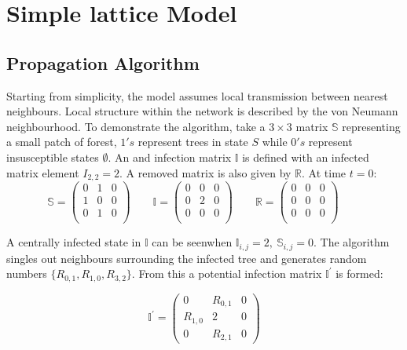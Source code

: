 \appendix
\chapter{Simple lattice Model}

\section{Propagation Algorithm}
\label{a:propagation}
Starting from simplicity, the model assumes local transmission between nearest neighbours. Local structure within the network is described by the von Neumann neighbourhood. To demonstrate the algorithm, take a $3 \times 3$  matrix $\mathbb{S}$ representing a small patch of forest, $1's$ represent trees in state $S$ while $0's$ represent insusceptible states $\emptyset$. An and infection matrix $\mathbb{I}$ is defined with an infected matrix element $I_{2,2}=2$. A removed matrix is also given by $\mathbb{R}$. At time $t=0$:
\begin{equation}
\mathbb{S}= \left( \begin{array}{ccc}
0 & 1 & 0\\
1 & 0 & 0\\
0& 1 & 0 \\
\end{array} \right)\qquad
\mathbb{I}= \left( \begin{array}{ccc}
0 & 0 & 0\\
0 &2 & 0\\
0& 0 & 0 \\
\end{array} \right)\qquad
\mathbb{R} = \left( \begin{array}{ccc}
0 & 0 & 0\\
0 & 0 & 0\\
0 & 0 & 0 \\
\end{array} \right)\qquad
\end{equation}

A centrally infected state in $\mathbb{I}$ can be seen\textemdash when $\mathbb{I}_{i,j} = 2,\ \mathbb{S}_{i,j} = 0$. The algorithm singles out neighbours surrounding the infected tree and generates random numbers $\{ R_{0,1},R_{1,0},R_{3,2}\}$. From this a potential infection matrix $\mathbb{I}^{'}$ is formed:

\begin{equation}
    \mathbb{I}^{'} = \begin{pmatrix}
        0 & R_{0,1} & 0 \\
        R_{1,0} & 2 & 0 \\
        0 & R_{2,1} & 0 
     \end{pmatrix}
\end{equation}

